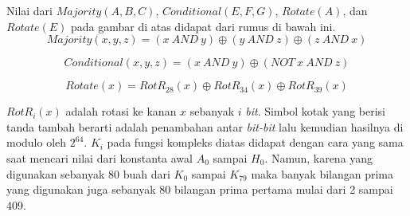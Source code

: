 Nilai dari \begin{math}Majority(A, B, C)\end{math}, \begin{math}Conditional(E, F, G)\end{math}, \begin{math}Rotate(A)\end{math}, dan \begin{math}Rotate(E)\end{math} pada gambar di atas didapat dari rumus di bawah ini.
\begin{displaymath}
	Majority(x,y,z) = (x\: AND\: y)  \oplus (y\: AND\: z) \oplus (z\: AND\: x)
\end{displaymath}

\begin{displaymath}
	Conditional(x,y,z) = (x\: AND\: y)  \oplus (NOT\: x\: AND\: z) 
\end{displaymath}

\begin{displaymath}
	Rotate(x) = RotR_{28}(x) \oplus RotR_{34}(x) \oplus RotR_{39}(x) 
\end{displaymath}

\begin{math}RotR_i(x)\end{math} adalah rotasi ke kanan \begin{math}x\end{math} sebanyak \begin{math}i\end{math} \textit{bit}. Simbol kotak yang berisi tanda tambah berarti adalah penambahan antar \textit{bit-bit} lalu kemudian hasilnya di modulo oleh \begin{math}2^{64}\end{math}. \begin{math}K_i\end{math} pada fungsi kompleks diatas didapat dengan cara yang sama saat mencari nilai dari konstanta awal \begin{math}A_0\end{math} sampai \begin{math}H_0\end{math}. Namun, karena yang digunakan sebanyak 80 buah dari \begin{math}K_0\end{math} sampai \begin{math}K_{79}\end{math} maka banyak bilangan prima yang digunakan juga sebanyak 80 bilangan prima pertama mulai dari 2 sampai 409.

